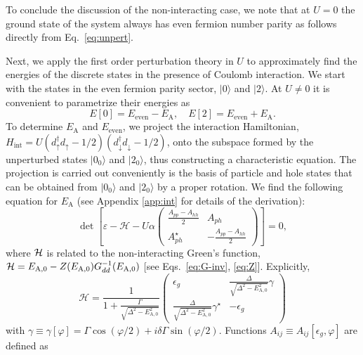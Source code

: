 \documentclass[aps,reprint,longbibliography, prb]{revtex4-2}
\begin{document}
To conclude the discussion of the non-interacting case, we note that at $U = 0$ the ground state of the system always has even fermion number parity as follows directly from Eq.~\eqref{eq:unpert}.

Next, we apply the first order perturbation theory in $U$ to approximately find the energies of the discrete states in the presence of Coulomb interaction. We start with the states in the even fermion parity sector, $|0\rangle$ and $|2\rangle$. At $U \neq 0$ it is convenient to parametrize their energies as
\begin{equation}
\label{eq:E02}
E[0] = E_\mathrm{even} - E_\mathrm{A},\quad E[2] = E_\mathrm{even} + E_\mathrm{A}.
\end{equation}
To determine $E_\mathrm{A}$ and $E_\mathrm{even}$, we project the interaction Hamiltonian, $H_\mathrm{int} = U (d_\uparrow^\dagger d_\uparrow - 1/2) (d_\downarrow^\dagger d_\downarrow - 1/2)$, onto the subspace formed by the unperturbed states $|0_0\rangle$ and $|2_0\rangle$, thus constructing a characteristic equation.
The projection is carried out conveniently is the basis of particle and hole states that can be obtained from $|0_0\rangle$ and $|2_0\rangle$ by a proper rotation. We find the following equation for $E_\mathrm{A}$ (see Appendix \ref{app:int} for details of the derivation):
\begin{equation}
\label{eq:long-det}
    \det\left[\varepsilon - \mathcal{H} - U\alpha
\begin{pmatrix}
\frac{A_{pp}-A_{hh}}{2}&A_{ph}\\
A_{ph}^\star&-\frac{A_{pp}-A_{hh}}{2}
\end{pmatrix}
\right] = 0,
\end{equation}
where ${\cal H}$ is related to the non-interacting Green's function, ${\cal H} = E_{\rm A,0} - Z(E_{\rm A,0}) G^{-1}_{dd}(E_{\rm A,0})$ [see Eqs.~\eqref{eq:G-inv}, \eqref{eq:Z}]. Explicitly,
\begin{equation}
    \mathcal{H} = \frac{1}{1+\frac{\Gamma}{\sqrt{\Delta^2 - E_\mathrm{A,0}^2}}}
    \begin{pmatrix}
    \epsilon_g & \frac{\Delta}{\sqrt{\Delta^2 - E_\mathrm{A,0}^2}}\gamma\\
    \frac{\Delta}{\sqrt{\Delta^2 - E_\mathrm{A,0}^2}}\gamma^\star& -\epsilon_g
    \end{pmatrix}
\end{equation}
with $\gamma\equiv\gamma[\varphi]= \Gamma\cos(\varphi/2) + i\delta\Gamma \sin(\varphi/2)$.
Functions $A_{ij}\equiv A_{ij}[\epsilon_g, \varphi]$ are defined as
\end{document}
